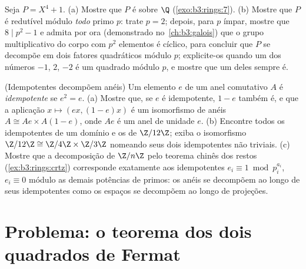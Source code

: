 \begin{exercise}[$\star\star\star$]\label{exo:b3:rings:11}
Seja $P = X^4 + 1$.
(a) Mostre que $P$ é  sobre $\Q$ (\cref{exo:b3:rings:7}).
(b) Mostre que $P$ é redutível módulo \emph{todo} primo $p$:
trate $p = 2$; depois, para $p$ ímpar, mostre que $8 \mid p^2 - 1$ e
admita por ora (demonstrado no~\cref{ch:b3:galois}) que o grupo
multiplicativo do corpo com $p^2$ elementos é cíclico, para concluir
que $P$ se decompõe em dois fatores quadráticos módulo $p$;
explicite-os quando um dos números $-1$, $2$, $-2$ é um
quadrado módulo $p$, e mostre que um deles sempre é.
\end{exercise}

\begin{exercise}[$\star\star$]\label{exo:b3:rings:12}
(Idempotentes decompõem anéis) Um elemento $e$ de um anel comutativo
$A$ é \emph{idempotente} se $e^2 = e$.
(a) Mostre que, se $e$ é idempotente, $1 - e$ também é, e que a
aplicação $x \mapsto (ex, (1-e)x)$ é um isomorfismo de anéis $A
\cong Ae \times A(1-e)$, onde $Ae$ é um anel
de unidade $e$.
(b) Encontre todos os idempotentes de um domínio e os de $\Z/12\Z$; exiba o
isomorfismo $\Z/12\Z \cong \Z/4\Z \times \Z/3\Z$ nomeando seus dois idempotentes não triviais.
(c) Mostre que a decomposição de $\Z/n\Z$ pelo teorema chinês dos
restos (\cref{ex:b3:rings:crtz}) corresponde exatamente aos idempotentes $e_i \equiv 1 \bmod p_i^{a_i}$,
$e_i \equiv 0$ módulo as demais potências de primos: os anéis se decompõem ao
longo de seus idempotentes como os espaços se decompõem ao longo de
projeções.
\end{exercise}

\section{Problema: o teorema dos dois quadrados de Fermat}

